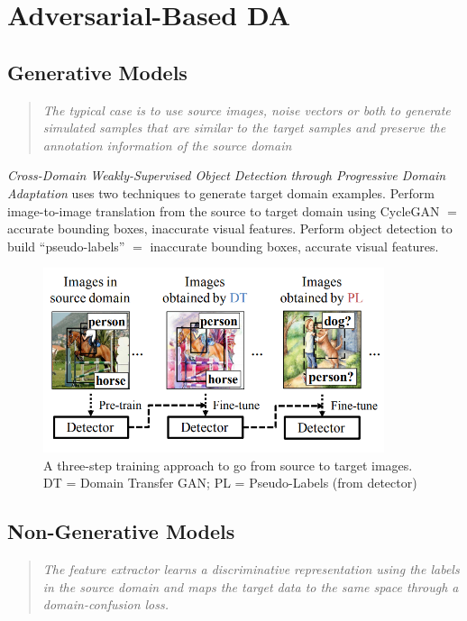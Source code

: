 \documentclass{report}
\newcommand{\quoteit}[1]{\begin{quote}\textit{#1}\end{quote}}
\begin{document}
\section{Adversarial-Based DA}

\subsection{Generative Models}
\quoteit{The typical case is to use source images, noise vectors or both to generate simulated samples that are similar to the target samples and preserve the annotation information of the source domain}
\textit{Cross-Domain Weakly-Supervised Object Detection through Progressive Domain Adaptation}\parencite{crossdomainweakly} uses two techniques to generate target domain examples. Perform image-to-image translation from the source to target domain using CycleGAN $=$ accurate bounding boxes, inaccurate visual features. Perform object detection to build ``pseudo-labels'' $=$ inaccurate bounding boxes, accurate visual features.
\begin{figure}
	\centering
	\includegraphics[width=10cm]{imgs/crossdomainweakly}
	\caption{A three-step training approach to go from source to target images. DT = Domain Transfer GAN; PL = Pseudo-Labels (from detector)}
	\label{fig:crossdomainweakly}
\end{figure}

\subsection{Non-Generative Models}
\quoteit{The feature extractor learns a discriminative representation using the labels in the source domain and maps the target data to the same space through a domain-confusion loss.}
\end{document}
